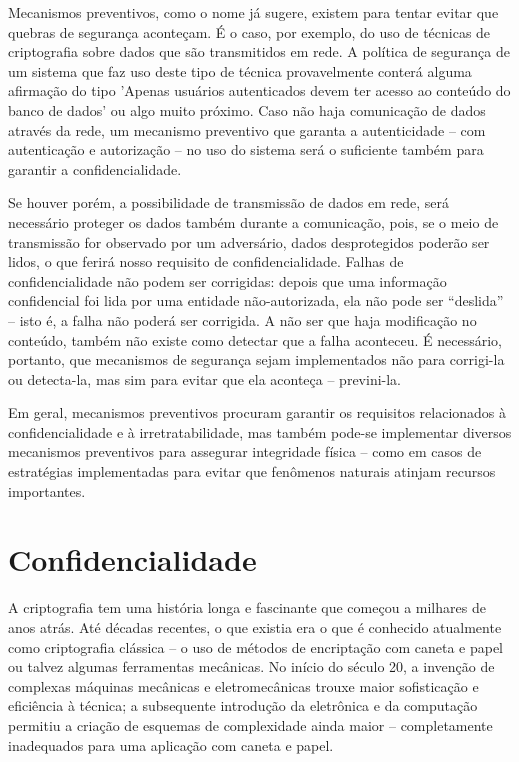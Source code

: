 \documentclass[
	10pt,				%
	openright,			%
	twoside,			%
	a5paper,			%
	english,			%
	french,				%
	spanish,			%
	brazil,				%
	sumario=tradicional
]{abntex2}
\begin{document}
Mecanismos preventivos, como o nome já sugere, existem para tentar evitar que quebras de segurança aconteçam. É o caso, por exemplo, do uso de técnicas de criptografia sobre dados que são transmitidos em rede. A política de segurança de um sistema que faz uso deste tipo de técnica provavelmente conterá alguma afirmação do tipo 'Apenas usuários autenticados devem ter acesso ao conteúdo do banco de dados' ou algo muito próximo. Caso não haja comunicação de dados através da rede, um mecanismo preventivo que garanta a autenticidade – com autenticação e autorização – no uso do sistema será o suficiente também para garantir a confidencialidade.

Se houver porém, a possibilidade de transmissão de dados em rede, será necessário proteger os dados também durante a comunicação, pois, se o meio de transmissão for observado por um adversário, dados desprotegidos poderão ser lidos, o que ferirá nosso requisito de confidencialidade. Falhas de confidencialidade não podem ser corrigidas: depois que uma informação confidencial foi lida por uma entidade não-autorizada, ela não pode ser “deslida” – isto é, a falha não poderá ser corrigida. A não ser que haja modificação no conteúdo, também não existe como detectar que a falha aconteceu. É necessário, portanto, que mecanismos de segurança sejam implementados não para corrigi-la ou detecta-la, mas sim para evitar que ela aconteça – previni-la.

Em geral, mecanismos preventivos procuram garantir os requisitos relacionados à confidencialidade e à irretratabilidade, mas também pode-se implementar diversos mecanismos preventivos para assegurar integridade física – como em casos de estratégias implementadas para evitar que fenômenos naturais atinjam recursos importantes.

\chapter{Confidencialidade}

A criptografia tem uma história longa e fascinante que começou a milhares de anos atrás. Até décadas recentes, o que existia era o que é conhecido atualmente como criptografia clássica – o uso de métodos de encriptação com caneta e papel ou talvez algumas ferramentas mecânicas. No início do século 20, a invenção de complexas máquinas mecânicas e eletromecânicas trouxe maior sofisticação e eficiência à técnica; a subsequente introdução da eletrônica e da computação permitiu a criação de esquemas de complexidade ainda maior – completamente inadequados para uma aplicação com caneta e papel.
\end{document}
